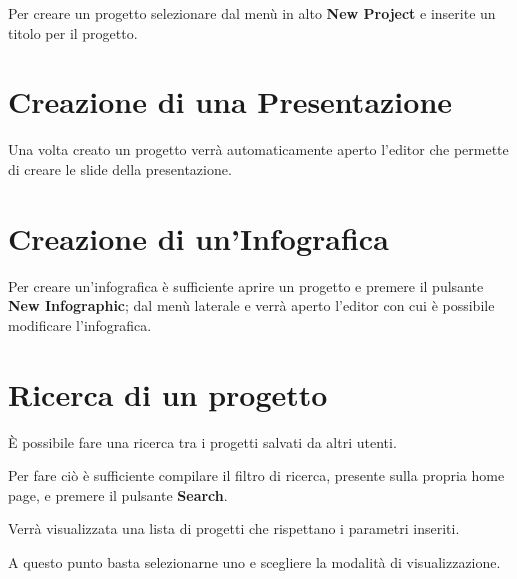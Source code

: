 \noindent Per creare un progetto selezionare dal menù in alto \textbf{New Project} e inserite un titolo per il progetto.


\section{Creazione di una Presentazione}

Una volta creato un progetto verrà automaticamente aperto l'editor che permette di creare le slide della presentazione.

\section{Creazione di un'Infografica}

Per creare un'infografica è sufficiente aprire un progetto e premere il pulsante \textbf{New Infographic}; dal menù laterale e verrà aperto l'editor con cui è possibile modificare l'infografica.

\section{Ricerca di un progetto}

È possibile fare una ricerca tra i progetti salvati da altri utenti.

\noindent Per fare ciò è sufficiente compilare il filtro di ricerca, presente sulla propria home page, e premere il pulsante \textbf{Search}.

Verrà visualizzata una lista di progetti che rispettano i parametri inseriti.

\noindent A questo punto basta selezionarne uno e scegliere la modalità di visualizzazione.